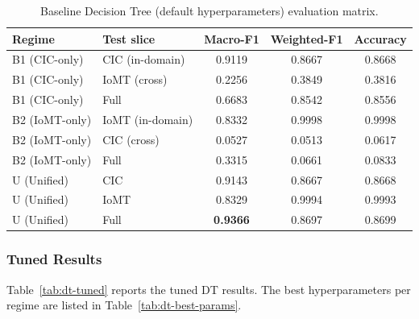 \begin{table}[H]
\centering
\caption{Baseline Decision Tree (default hyperparameters) evaluation matrix.}
\label{tab:dt-baseline}
\small
\begin{tabular}{@{}l l c c c@{}}
\toprule
\textbf{Regime} & \textbf{Test slice} & \textbf{Macro-F1} & \textbf{Weighted-F1} & \textbf{Accuracy} \\
\midrule
B1 (CIC-only) & CIC (in-domain)  & 0.9119 & 0.8667 & 0.8668 \\
B1 (CIC-only) & IoMT (cross)     & 0.2256 & 0.3849 & 0.3816 \\
B1 (CIC-only) & Full             & 0.6683 & 0.8542 & 0.8556 \\
\midrule
B2 (IoMT-only) & IoMT (in-domain) & 0.8332 & 0.9998 & 0.9998 \\
B2 (IoMT-only) & CIC (cross)      & 0.0527 & 0.0513 & 0.0617 \\
B2 (IoMT-only) & Full             & 0.3315 & 0.0661 & 0.0833 \\
\midrule
U (Unified)    & CIC              & 0.9143 & 0.8667 & 0.8668 \\
U (Unified)    & IoMT             & 0.8329 & 0.9994 & 0.9993 \\
U (Unified)    & Full             & \textbf{0.9366} & 0.8697 & 0.8699 \\
\bottomrule
\end{tabular}
\end{table}
\FloatBarrier

\subsubsection{Tuned Results}

Table~\ref{tab:dt-tuned} reports the tuned DT results. The best hyperparameters per regime are listed in Table~\ref{tab:dt-best-params}.

